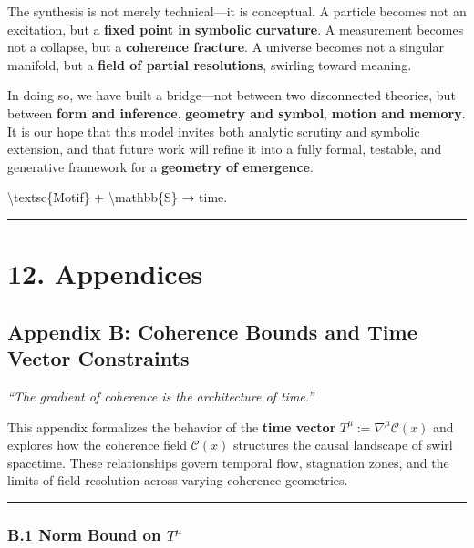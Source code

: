 \documentclass[
  11pt,
]{article}
\begin{document}
The synthesis is not merely technical---it is conceptual. A particle
becomes not an excitation, but a \textbf{fixed point in symbolic
curvature}. A measurement becomes not a collapse, but a
\textbf{coherence fracture}. A universe becomes not a singular manifold,
but a \textbf{field of partial resolutions}, swirling toward meaning.

In doing so, we have built a bridge---not between two disconnected
theories, but between \textbf{form and inference}, \textbf{geometry and
symbol}, \textbf{motion and memory}. It is our hope that this model
invites both analytic scrutiny and symbolic extension, and that future
work will refine it into a fully formal, testable, and generative
framework for a \textbf{geometry of emergence}.

\textbackslash textsc\{Motif\} + \textbackslash mathbb\{S\} → time.

\begin{center}\rule{0.5\linewidth}{0.5pt}\end{center}

\section{\texorpdfstring{12.
\textbf{Appendices}}{12. Appendices}}\label{appendices-1}

\subsection{\texorpdfstring{\textbf{Appendix B: Coherence Bounds and
Time Vector
Constraints}}{Appendix B: Coherence Bounds and Time Vector Constraints}}\label{appendix-b-coherence-bounds-and-time-vector-constraints}

\emph{``The gradient of coherence is the architecture of time.''}

This appendix formalizes the behavior of the \textbf{time vector}
\(T^\mu := \nabla^\mu \mathcal{C}(x)\) and explores how the coherence
field \(\mathcal{C}(x)\) structures the causal landscape of swirl
spacetime. These relationships govern temporal flow, stagnation zones,
and the limits of field resolution across varying coherence geometries.

\begin{center}\rule{0.5\linewidth}{0.5pt}\end{center}

\subsubsection{\texorpdfstring{\textbf{B.1 Norm Bound on
\(T^\mu\)}}{B.1 Norm Bound on T\^{}\textbackslash mu}}\label{b.1-norm-bound-on-tmu}
\end{document}
